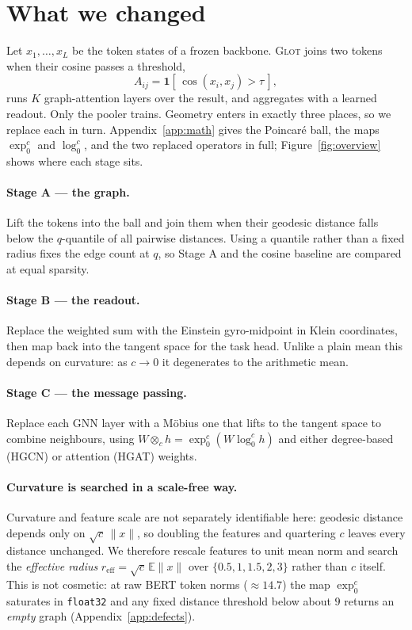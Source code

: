 \documentclass{article}
\begin{document}
\section{What we changed}
\label{sec:method}

Let $x_1,\dots,x_L$ be the token states of a frozen backbone. \textsc{Glot}
joins two tokens when their cosine passes a threshold,
\begin{equation}
A_{ij} = \mathbf{1}\!\left[\, \cos(x_i, x_j) > \tau \,\right],
\label{eq:adj}
\end{equation}
runs $K$ graph-attention layers over the result, and aggregates with a learned
readout. Only the pooler trains. Geometry enters in exactly three places, so we
replace each in turn. Appendix~\ref{app:math} gives the Poincar\'e ball, the
maps $\exp^c_0$ and $\log^c_0$, and the two replaced operators in full;
Figure~\ref{fig:overview} shows where each stage sits.

\paragraph{Stage A --- the graph.} Lift the tokens into the ball and join them
when their geodesic distance falls below the $q$-quantile of all pairwise
distances. Using a quantile rather than a fixed radius fixes the edge count at
$q$, so Stage A and the cosine baseline are compared at equal sparsity.

\paragraph{Stage B --- the readout.} Replace the weighted sum with the Einstein
gyro-midpoint in Klein coordinates, then map back into the tangent space for the
task head. Unlike a plain mean this depends on curvature: as $c \rightarrow 0$
it degenerates to the arithmetic mean.

\paragraph{Stage C --- the message passing.} Replace each GNN layer with a
M\"obius one that lifts to the tangent space to combine neighbours, using
$W \otimes_c h = \exp^c_0(W \log^c_0 h)$ and either degree-based (HGCN) or
attention (HGAT) weights.

\paragraph{Curvature is searched in a scale-free way.} Curvature and feature
scale are not separately identifiable here: geodesic distance depends only on
$\sqrt{c}\,\|x\|$, so doubling the features and quartering $c$ leaves every
distance unchanged. We therefore rescale features to unit mean norm and search
the \emph{effective radius} $r_{\text{eff}} = \sqrt{c}\,\mathbb{E}\|x\|$ over
$\{0.5, 1, 1.5, 2, 3\}$ rather than $c$ itself. This is not cosmetic: at raw
BERT token norms ($\approx 14.7$) the map $\exp^c_0$ saturates in
\texttt{float32} and any fixed distance threshold below about $9$ returns an
\emph{empty} graph (Appendix~\ref{app:defects}).
\end{document}
